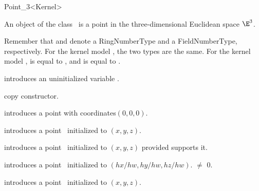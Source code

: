 \begin{ccRefClass} {Point_3<Kernel>}

\ccDefinition
An object of the class \ccRefName\ is a point in the three-dimensional
Euclidean space $\E^3$. 

Remember that  and  denote a
RingNumberType and a FieldNumberType, respectively. For the kernel
model , the two types are the same. For the
kernel model ,  is equal
to , and  is equal to
.

\ccTypes
{}
\ccThreeToTwo


\ccCreation
{}


\ccHidden {}
             {introduces an uninitialized variable \ccVar.}

\ccHidden {}
            {copy constructor.}

            {introduces a point with  coordinates$(0,0,0)$.}

            {introduces a point \ccVar\ initialized to $(x,y,z)$.}

            {introduces a point \ccVar\ initialized to $(x,y,z)$
             provided  supports it.}

            {introduces a point \ccVar\ initialized to $(hx/hw,hy/hw, hz/hw)$.
             \ccPrecond {} $\neq$ 0.}

            {introduces a point \ccVar\ initialized to $(x,y,z)$.}


\ccOperations


\end{ccRefClass}
